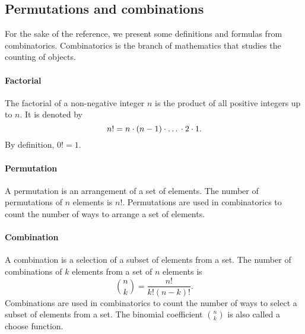 \subsection{Permutations and combinations}

For the sake of the reference, we present some definitions and formulas from
combinatorics. Combinatorics is the branch of mathematics that studies the counting of
objects.

\paragraph{Factorial}  The factorial of a non-negative integer $n$ is the product of all
positive integers up to $n$.  It is denoted by
\[
  n! = n \cdot (n - 1) \cdot \text\dots \cdot 2 \cdot 1\text{.}
\]
By definition, $0! = 1$.

\paragraph{Permutation}  A permutation is an arrangement of a set of elements.  The
number of permutations of $n$ elements is $n!$.  Permutations are used in combinatorics
to count the number of ways to arrange a set of elements.

\paragraph{Combination}  A combination is a selection of a subset of elements from a set.
The number of combinations of $k$ elements from a set of $n$ elements is $$\binom{n}{k} =
\frac{n!}{k!(n - k)!}\text{.}$$  Combinations are used in combinatorics to count the
number of ways to select a subset of elements from a set.  The binomial coefficient
$\binom{n}{k}$ is also called a choose function.


